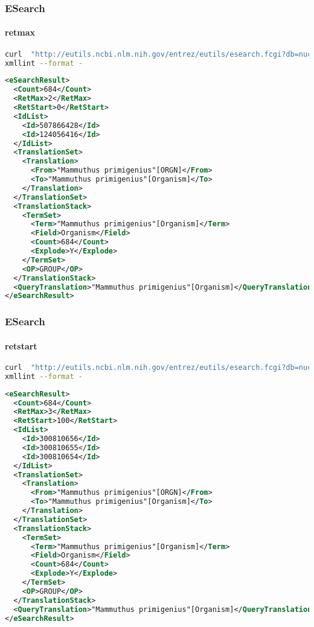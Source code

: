 \documentclass{beamer}
\begin{document}
\begin{frame}[fragile]
\frametitle{ESearch}
\framesubtitle{retmax  }
\begin{lstlisting}[language=bash,basicstyle=\tiny,breaklines=true]
curl  "http://eutils.ncbi.nlm.nih.gov/entrez/eutils/esearch.fcgi?db=nucleotide&term=%22Mammuthus%20primigenius%22%5BORGN%5D&retmax=2" |\
xmllint --format -
\end{lstlisting}

\begin{lstlisting}[language=xml,basicstyle=\tiny,breaklines=false]
<eSearchResult>
  <Count>684</Count>
  <RetMax>2</RetMax>
  <RetStart>0</RetStart>
  <IdList>
    <Id>507866428</Id>
    <Id>124056416</Id>
  </IdList>
  <TranslationSet>
    <Translation>
      <From>"Mammuthus primigenius"[ORGN]</From>
      <To>"Mammuthus primigenius"[Organism]</To>
    </Translation>
  </TranslationSet>
  <TranslationStack>
    <TermSet>
      <Term>"Mammuthus primigenius"[Organism]</Term>
      <Field>Organism</Field>
      <Count>684</Count>
      <Explode>Y</Explode>
    </TermSet>
    <OP>GROUP</OP>
  </TranslationStack>
  <QueryTranslation>"Mammuthus primigenius"[Organism]</QueryTranslation>
</eSearchResult>
\end{lstlisting}
\end{frame}


\begin{frame}[fragile]
\frametitle{ESearch}
\framesubtitle{retstart  }
\begin{lstlisting}[language=bash,basicstyle=\tiny,breaklines=true]
curl  "http://eutils.ncbi.nlm.nih.gov/entrez/eutils/esearch.fcgi?db=nucleotide&term=%22Mammuthus%20primigenius%22%5BORGN%5D&retmax=2&retstart=100" |\
xmllint --format -
\end{lstlisting}

\begin{lstlisting}[language=xml,basicstyle=\tiny,breaklines=false]
<eSearchResult>
  <Count>684</Count>
  <RetMax>3</RetMax>
  <RetStart>100</RetStart>
  <IdList>
    <Id>300810656</Id>
    <Id>300810655</Id>
    <Id>300810654</Id>
  </IdList>
  <TranslationSet>
    <Translation>
      <From>"Mammuthus primigenius"[ORGN]</From>
      <To>"Mammuthus primigenius"[Organism]</To>
    </Translation>
  </TranslationSet>
  <TranslationStack>
    <TermSet>
      <Term>"Mammuthus primigenius"[Organism]</Term>
      <Field>Organism</Field>
      <Count>684</Count>
      <Explode>Y</Explode>
    </TermSet>
    <OP>GROUP</OP>
  </TranslationStack>
  <QueryTranslation>"Mammuthus primigenius"[Organism]</QueryTranslation>
</eSearchResult>
\end{lstlisting}
\end{frame}
\end{document}
